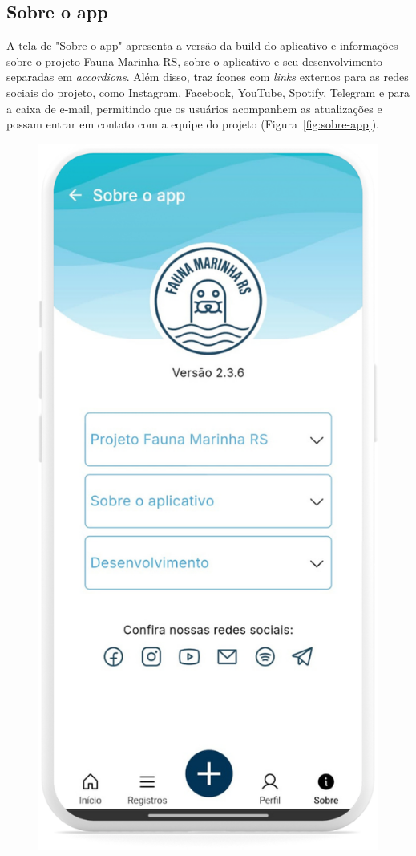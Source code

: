 

\subsection{Sobre o app}
A tela de "Sobre o app" apresenta a versão da build do aplicativo e
informações sobre o projeto Fauna Marinha RS, sobre o aplicativo e seu desenvolvimento separadas em \textit{accordions}.
Além disso, traz ícones com \textit{links} externos para as redes sociais do projeto,
como Instagram, Facebook, YouTube, Spotify, Telegram e para a caixa de e-mail, permitindo que os 
usuários acompanhem as atualizações e possam entrar em contato com a equipe do projeto (Figura~\ref{fig:sobre-app}).

\begin{figure}[H]
    \centering
    \includegraphics[height=0.7\textheight]{imagens/sistema/device_frame/sobre_app.png}

\end{figure}
